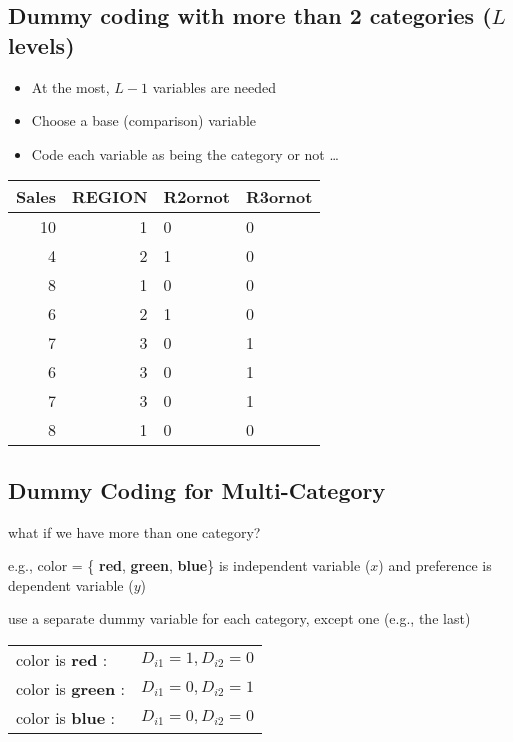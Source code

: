 \documentclass[10pt,article]{article}
\begin{document}
\subsection{Dummy coding with more than 2 categories (\(L\) levels)}
\label{sec:orge94439b}
\begin{multicols}{2}
\begin{itemize}
\item At the most, \(L-1\) variables are needed
\item Choose a base (comparison) variable
\item Code each variable as being the category or not \ldots{}
\end{itemize}

{\small
\begin{center}
\begin{tabular}{rrll}
Sales & REGION & R2ornot & R3ornot\\
\hline
10 & 1 &  0 &  0\\
4 & 2 &  1 &  0\\
8 & 1 &  0 &  0\\
6 & 2 &  1 &  0\\
7 & 3 &  0 &  1\\
6 & 3 &  0 &  1\\
7 & 3 &  0 &  1\\
8 & 1 &  0 &  0\\
\end{tabular}
\end{center}
}

\end{multicols}
\subsection{Dummy Coding for Multi-Category}
\label{sec:org2a47455}
what if we have more than one category?

e.g., color = \{ {\bf red},  {\bf green},
 {\bf blue}\} is independent variable (\(x\)) and preference is
dependent variable (\(y\))

use a separate dummy variable for each category, except one (e.g., the last)

\begin{center}
\begin{tabular}{ll}
color is  {\bf red} : & \(D_{i1} = 1, D_{i2} = 0\)\\
color is  {\bf green} : & \(D_{i1} = 0, D_{i2} = 1\)\\
color is  {\bf blue} : & \(D_{i1} = 0, D_{i2} = 0\)\\
\end{tabular}
\end{center}
\end{document}
